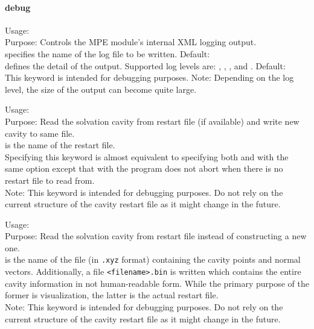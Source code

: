 \paragraph{debug}

{
  \noindent
  Usage:   
     \\[1.0ex] 
  Purpose: Controls the MPE module's internal XML logging 
    output. \\[1.0ex]
   specifies the name of the log file 
    to be written. Default:  \\
   defines the detail of the output. Supported 
    log levels are: , , , and
    . Default:  \\
}
This keyword is intended for debugging purposes. 
Note: Depending on the log level, the size of the output 
can become quite large. 


{
  \noindent
  Usage:   \\[1.0ex] 
  Purpose: Read the solvation cavity from restart file 
    (if available) and write new cavity to same file. \\[1.0ex]
   is the name of the restart file. \\
}
Specifying this keyword is almost equivalent to specifying 
both  and 
 with the same 
 option except that with 
 the program does not abort 
when there is no restart file to read from. \\
Note: This keyword is intended for debugging purposes. 
Do not rely on the current structure of the cavity restart 
file as it might change in the future. 

{
  \noindent
  Usage:   \\[1.0ex] 
  Purpose: Read the solvation cavity from restart file 
    instead of constructing a new one. \\[1.0ex]
   is the name of the file (in \texttt{.xyz} format)
  containing the cavity points and normal vectors. Additionally, a file
  \texttt{<filename>.bin} is written which contains the entire cavity
  information in not human-readable form. While the primary purpose of the
  former is visualization, the latter is the actual restart file.\\
}
Note: This keyword is intended for debugging purposes. 
Do not rely on the current structure of the cavity restart 
file as it might change in the future. 

